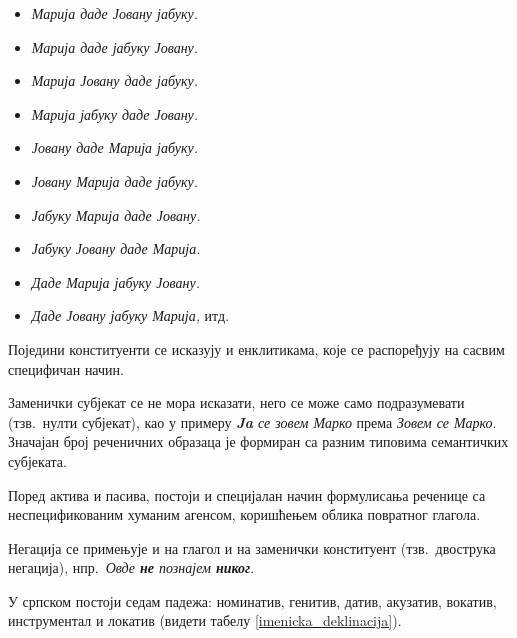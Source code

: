 \begin{multicols}{2}
\begin{itemize}
 \item \textit{Марија даде Јовану јабуку.}
 \item \textit{Марија даде јабуку Јовану.} 
 \item \textit{Марија Јовану даде јабуку.} 
 \item \textit{Марија јабуку даде Јовану.}
 \item \textit{Јовану даде Марија јабуку.}
 \item \textit{Јовану Марија даде јабуку.}
 \item \textit{Јабуку Марија даде Јовану.}
 \item \textit{Јабуку Јовану даде Марија.}
 \item \textit{Даде Марија јабуку Јовану.} 
 \item \textit{Даде Јовану јабуку Марија,} итд.
\end{itemize}
Поједини конституенти се исказују и енклитикама, које се распоређују на сасвим специфичан начин.

Заменички субјекат се не мора исказати, него се може само подразумевати (тзв.~нулти субјекат), као у примеру \textit{\textbf{Ja} се зовем Марко} према \textit{Зовем се Марко}. Значајан број реченичних образаца је формиран са разним типовима семантичких субјеката.

Поред актива и пасива, постоји и специјалан начин формулисања реченице са неспецификованим хуманим агенсом, коришћењем облика повратног глагола.

Негација се примењује и на глагол и на заменички конституент (тзв.~двострука негација), нпр.~\textit{Овде \textbf{не} познајем \textbf{никог}}.

У српском постоји седам падежа: номинатив, генитив, датив, акузатив, вокатив, инструментал и локатив (видети табелу \ref{imenicka_deklinacija}). 


\end{multicols}
